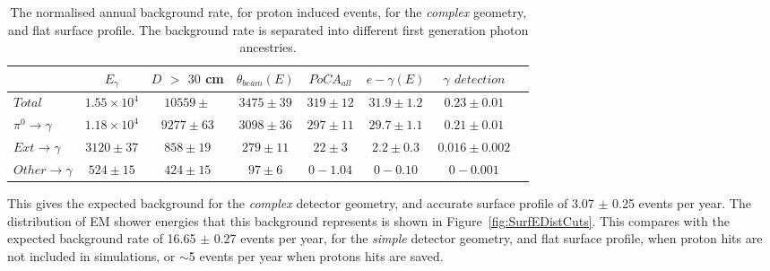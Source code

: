 \begin{table}
  \caption[The normalised annual background rate, for proton induced events, for the \emph{complex} geometry, and flat surface profile]
          {The normalised annual background rate, for proton induced events, for the \emph{complex} geometry, and flat surface profile. The background rate is separated into different first generation photon ancestries.}
  \label{tab:SurfProComp}
  \centering
  \scriptsize
  \begin{tabular}{l c c c c c c c }
    \toprule
        & $E_\gamma$ &  $D$ $>$ $30$ cm & $\theta_{beam}(E)$ & $PoCA_{all}$ & $e-\gamma(E)$ & $\gamma$ $detection$ \\
        \midrule
        $Total$          & $1.55\times10^4$ & $10559\pm$ & $3475\pm39$ & $319\pm12$ & $31.9\pm1.2$ & $0.23\pm0.01$ \\

        $\pi^0\to\gamma$ & $1.18\times10^4$ & $9277\pm63$  & $3098\pm36$ & $297\pm11$ & $29.7\pm1.1$ & $0.21\pm0.01$ \\

        $Ext\to\gamma$   & $3120\pm37$      & $858\pm19$   & $279\pm11$  & $22\pm3$   & $2.2\pm0.3$  & $0.016\pm0.002$ \\

        $Other\to\gamma$ & $524\pm15$       & $424\pm15$   & $97\pm6$    & $0-1.04$   & $0-0.10$     & $0-0.001$ \\
        \bottomrule
  \end{tabular}
\end{table}

This gives the expected background for the \emph{complex} detector geometry, and accurate surface profile of 3.07 $\pm$ 0.25 events per year. The distribution of EM shower energies that this background represents is shown in Figure~\ref{fig:SurfEDistCuts}. This compares with the expected background rate of 16.65 $\pm$ 0.27 events per year, for the \emph{simple} detector geometry, and flat surface profile, when proton hits are not included in simulations, or $\sim$5 events per year when protons hits are saved. \\

